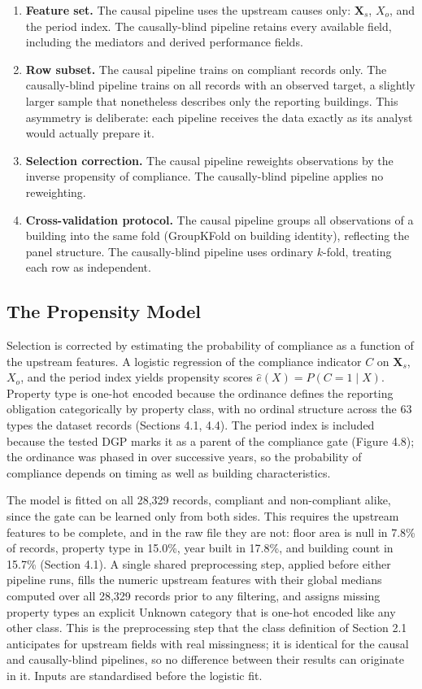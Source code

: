 \begin{enumerate}
  \item \textbf{Feature set.} The causal pipeline uses the upstream causes only: $\mathbf{X}_s$, $X_o$, and the period index. The causally-blind pipeline retains every available field, including the mediators and derived performance fields.
  \item \textbf{Row subset.} The causal pipeline trains on compliant records only. The causally-blind pipeline trains on all records with an observed target, a slightly larger sample that nonetheless describes only the reporting buildings. This asymmetry is deliberate: each pipeline receives the data exactly as its analyst would actually prepare it.
  \item \textbf{Selection correction.} The causal pipeline reweights observations by the inverse propensity of compliance. The causally-blind pipeline applies no reweighting.
  \item \textbf{Cross-validation protocol.} The causal pipeline groups all observations of a building into the same fold (GroupKFold on building identity), reflecting the panel structure. The causally-blind pipeline uses ordinary $k$-fold, treating each row as independent.
\end{enumerate}

\subsection{The Propensity Model}

Selection is corrected by estimating the probability of compliance as a function of the upstream features. A logistic regression of the compliance indicator $C$ on $\mathbf{X}_s$, $X_o$, and the period index yields propensity scores $\hat{e}(X) = P(C = 1 \mid X)$. Property type is one-hot encoded because the ordinance defines the reporting obligation categorically by property class, with no ordinal structure across the 63 types the dataset records (Sections 4.1, 4.4). The period index is included because the tested DGP marks it as a parent of the compliance gate (Figure 4.8); the ordinance was phased in over successive years, so the probability of compliance depends on timing as well as building characteristics.

The model is fitted on all 28,329 records, compliant and non-compliant alike, since the gate can be learned only from both sides. This requires the upstream features to be complete, and in the raw file they are not: floor area is null in 7.8\% of records, property type in 15.0\%, year built in 17.8\%, and building count in 15.7\% (Section 4.1). A single shared preprocessing step, applied before either pipeline runs, fills the numeric upstream features with their global medians computed over all 28,329 records prior to any filtering, and assigns missing property types an explicit Unknown category that is one-hot encoded like any other class. This is the preprocessing step that the class definition of Section 2.1 anticipates for upstream fields with real missingness; it is identical for the causal and causally-blind pipelines, so no difference between their results can originate in it. Inputs are standardised before the logistic fit.

